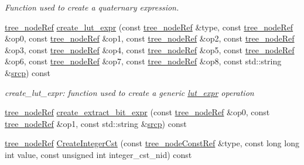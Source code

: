 \begin{DoxyCompactItemize}
\begin{DoxyCompactList}\small\item\em Function used to create a quaternary expression. \end{DoxyCompactList}\item 
\hyperlink{tree__node_8hpp_a6ee377554d1c4871ad66a337eaa67fd5}{tree\+\_\+node\+Ref} \hyperlink{classtree__manipulation_a4e5bf5b7cfb6244c0a2b7e13c0ac4514}{create\+\_\+lut\+\_\+expr} (const \hyperlink{tree__node_8hpp_a6ee377554d1c4871ad66a337eaa67fd5}{tree\+\_\+node\+Ref} \&type, const \hyperlink{tree__node_8hpp_a6ee377554d1c4871ad66a337eaa67fd5}{tree\+\_\+node\+Ref} \&op0, const \hyperlink{tree__node_8hpp_a6ee377554d1c4871ad66a337eaa67fd5}{tree\+\_\+node\+Ref} \&op1, const \hyperlink{tree__node_8hpp_a6ee377554d1c4871ad66a337eaa67fd5}{tree\+\_\+node\+Ref} \&op2, const \hyperlink{tree__node_8hpp_a6ee377554d1c4871ad66a337eaa67fd5}{tree\+\_\+node\+Ref} \&op3, const \hyperlink{tree__node_8hpp_a6ee377554d1c4871ad66a337eaa67fd5}{tree\+\_\+node\+Ref} \&op4, const \hyperlink{tree__node_8hpp_a6ee377554d1c4871ad66a337eaa67fd5}{tree\+\_\+node\+Ref} \&op5, const \hyperlink{tree__node_8hpp_a6ee377554d1c4871ad66a337eaa67fd5}{tree\+\_\+node\+Ref} \&op6, const \hyperlink{tree__node_8hpp_a6ee377554d1c4871ad66a337eaa67fd5}{tree\+\_\+node\+Ref} \&op7, const \hyperlink{tree__node_8hpp_a6ee377554d1c4871ad66a337eaa67fd5}{tree\+\_\+node\+Ref} \&op8, const std\+::string \&\hyperlink{structsrcp}{srcp}) const
\begin{DoxyCompactList}\small\item\em create\+\_\+lut\+\_\+expr\+: function used to create a generic \hyperlink{structlut__expr}{lut\+\_\+expr} operation \end{DoxyCompactList}\item 
\hyperlink{tree__node_8hpp_a6ee377554d1c4871ad66a337eaa67fd5}{tree\+\_\+node\+Ref} \hyperlink{classtree__manipulation_a81c9b97eea8118088f9631d222b443cf}{create\+\_\+extract\+\_\+bit\+\_\+expr} (const \hyperlink{tree__node_8hpp_a6ee377554d1c4871ad66a337eaa67fd5}{tree\+\_\+node\+Ref} \&op0, const \hyperlink{tree__node_8hpp_a6ee377554d1c4871ad66a337eaa67fd5}{tree\+\_\+node\+Ref} \&op1, const std\+::string \&\hyperlink{structsrcp}{srcp}) const
\item 
\hyperlink{tree__node_8hpp_a6ee377554d1c4871ad66a337eaa67fd5}{tree\+\_\+node\+Ref} \hyperlink{classtree__manipulation_ac77ee11b047981b9f464694c96e22238}{Create\+Integer\+Cst} (const \hyperlink{tree__node_8hpp_a3cf5d02292c940f3892425a5b5fdec3c}{tree\+\_\+node\+Const\+Ref} \&type, const long long int value, const unsigned int integer\+\_\+cst\+\_\+nid) const

\end{DoxyCompactItemize}
